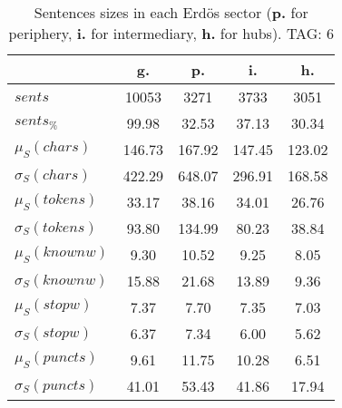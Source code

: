 \begin{table}[h!]
\begin{center}
\begin{tabular}{| l || c | c | c | c |}\hline
 & {\bf g.} & {\bf p.} & {\bf i.} & {\bf h.} \\\hline\hline
$sents$ & 10053  & 3271  & 3733  & 3051 \\
$sents_{\%}$ & 99.98  & 32.53  & 37.13  & 30.34 \\\hline
$\mu_S(chars)$ & 146.73  & 167.92  & 147.45  & 123.02 \\
$\sigma_S(chars)$ & 422.29  & 648.07  & 296.91  & 168.58 \\\hline
$\mu_S(tokens)$ & 33.17  & 38.16  & 34.01  & 26.76 \\
$\sigma_S(tokens)$ & 93.80  & 134.99  & 80.23  & 38.84 \\\hline
$\mu_S(knownw)$ & 9.30  & 10.52  & 9.25  & 8.05 \\
$\sigma_S(knownw)$ & 15.88  & 21.68  & 13.89  & 9.36 \\\hline
$\mu_S(stopw)$ & 7.37  & 7.70  & 7.35  & 7.03 \\
$\sigma_S(stopw)$ & 6.37  & 7.34  & 6.00  & 5.62 \\\hline
$\mu_S(puncts)$ & 9.61  & 11.75  & 10.28  & 6.51 \\
$\sigma_S(puncts)$ & 41.01  & 53.43  & 41.86  & 17.94 \\\hline
\end{tabular}
\caption{Sentences sizes in each Erd\"os sector ({{\bf p.}} for periphery, {{\bf i.}} for intermediary, {{\bf h.}} for hubs). TAG: 6}
\end{center}
\end{table}